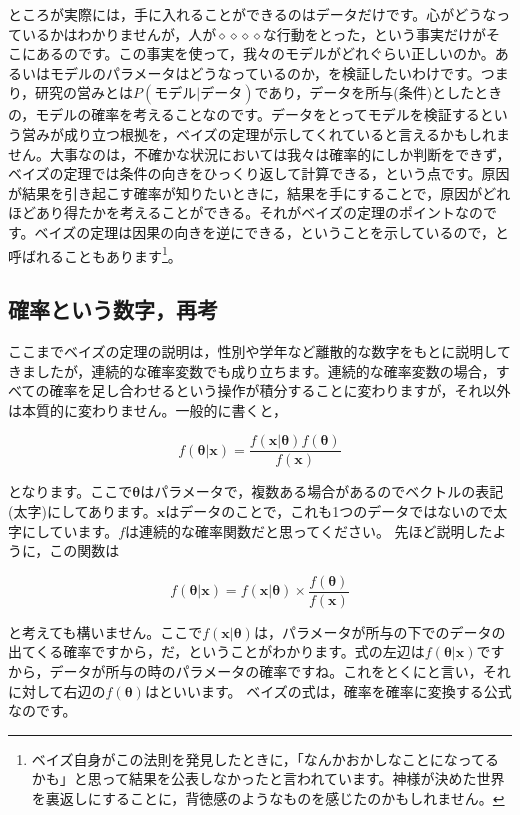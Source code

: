 \documentclass{ltjbook}
\begin{document}
ところが実際には，手に入れることができるのはデータだけです。心がどうなっているかはわかりませんが，人が$\diamond\diamond\diamond\diamond$な行動をとった，という事実だけがそこにあるのです。この事実を使って，我々のモデルがどれぐらい正しいのか。あるいはモデルのパラメータはどうなっているのか，を検証したいわけです。つまり，研究の営みとは$P(\mbox{モデル}|\mbox{データ})$であり，データを所与(条件)としたときの，モデルの確率を考えることなのです。データをとってモデルを検証するという営みが成り立つ根拠を，ベイズの定理が示してくれていると言えるかもしれません。大事なのは，不確かな状況においては我々は確率的にしか判断をできず，ベイズの定理では条件の向きをひっくり返して計算できる，という点です。原因が結果を引き起こす確率が知りたいときに，結果を手にすることで，原因がどれほどあり得たかを考えることができる。それがベイズの定理のポイントなのです。ベイズの定理は因果の向きを逆にできる，ということを示しているので，と呼ばれることもあります\footnote{ベイズ自身がこの法則を発見したときに，「なんかおかしなことになってるかも」と思って結果を公表しなかったと言われています。神様が決めた世界を裏返しにすることに，背徳感のようなものを感じたのかもしれません。}。

\subsection{確率という数字，再考}
ここまでベイズの定理の説明は，性別や学年など離散的な数字をもとに説明してきましたが，連続的な確率変数でも成り立ちます。連続的な確率変数の場合，すべての確率を足し合わせるという操作が積分することに変わりますが，それ以外は本質的に変わりません。一般的に書くと，

\[ f(\bm{\theta}|\bm{x}) = \frac{f(\bm{x}|\bm{\theta})f(\bm{\theta})}{f(\bm{x})} \]

となります。ここで$\bm{\theta}$はパラメータで，複数ある場合があるのでベクトルの表記(太字)にしてあります。$\bm{x}$はデータのことで，これも1つのデータではないので太字にしています。$f$は連続的な確率関数だと思ってください。
先ほど説明したように，この関数は

\[ f(\bm{\theta}|\bm{x}) = f(\bm{x}|\bm{\theta}) \times \frac{f(\bm{\theta})}{f(\bm{x})} \]

と考えても構いません。ここで$f(\bm{x}|\bm{\theta})$は，パラメータが所与の下でのデータの出てくる確率ですから，だ，ということがわかります。式の左辺は$ f(\bm{\theta}|\bm{x})$ですから，データが所与の時のパラメータの確率ですね。これをとくにと言い，それに対して右辺の$f(\bm{\theta})$はといいます。
ベイズの式は，確率を確率に変換する公式なのです。
\end{document}
